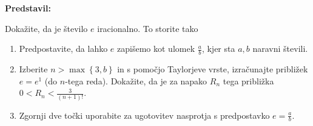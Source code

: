 \textbf{Predstavil: }

Dokažite, da je število $e$ iracionalno. To storite tako
\begin{enumerate}
	\item Predpostavite, da lahko $e$ zapišemo kot ulomek $\frac{a}{b}$, kjer sta $a,b$ naravni števili.
	\item Izberite $n > \max \left\{ 3,b \right\}$ in s pomočjo Taylorjeve vrste, izračunajte približek $e = e^1$ (do $n$-tega reda). Dokažite, da je za napako $R_n$ tega približka $0 < R_{n} < \frac{3}{(n+1)!}$.
	\item Zgornji dve točki uporabite za ugotovitev nasprotja s predpostavko $e=\frac{a}{b}$.
\end{enumerate}